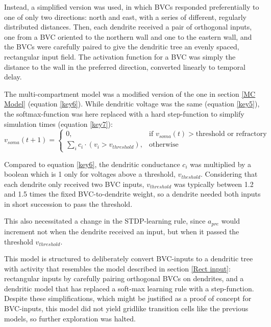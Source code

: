\documentclass{article}
\begin{document}
    Instead, a simplified version was used, in which BVCs responded preferentially to one of only two directions: north and east, with a series of different, regularly distributed distances. Then, each dendrite received a pair of orthogonal inputs, one from a BVC oriented to the northern wall and one to the eastern wall, and the BVCs were carefully paired to give the dendritic tree an evenly spaced, rectangular input field. The activation function for a BVC was simply the distance to the wall in the preferred direction, converted linearly to temporal delay.
        
    The multi-compartment model was a modified version of the one in section \ref{MC Model} (equation \ref{key6}). While dendritic voltage was the same (equation \ref{key5}), the softmax-function was here replaced with a hard step-function to simplify simulation times (equation \ref{key7}):
    \begin{equation}\label{key7} v_{soma}(t + 1) = \begin{cases} 0, & \text{if } v_{soma}(t) > \text{threshold or refractory}\\
        \sum_{i}^{} c_i \cdot (v_i > v_{threshold}), & \text{otherwise} \end{cases}\end{equation} 
    
    Compared to equation \ref{key6}, the dendritic conductance \(c_i\) was multiplied by a boolean which is 1 only for voltages above a threshold, \(v_{theshold}\). Considering that each dendrite only received two BVC inputs, \(v_{threshold}\) was typically between 1.2 and 1.5 times the fixed BVC-to-dendrite weight, so a dendrite needed both inputs in short succession to pass the threshold.

    This also necessitated a change in the STDP-learning rule, since \(a_{pre}\) would increment not when the dendrite received an input, but when it passed the threshold \(v_{threshold}\).

    This model is structured to deliberately convert BVC-inputs to a dendritic tree with activity that resembles the model described in section \ref{Rect input}: rectangular inputs by carefully pairing orthogonal BVCs on dendrites, and a dendritic model that has replaced a soft-max learning rule with a step-function. Despite these simplifications, which might be justified as a proof of concept for BVC-inputs, this model did not yield gridlike transition cells like the previous models, so further exploration was halted.
\end{document}
